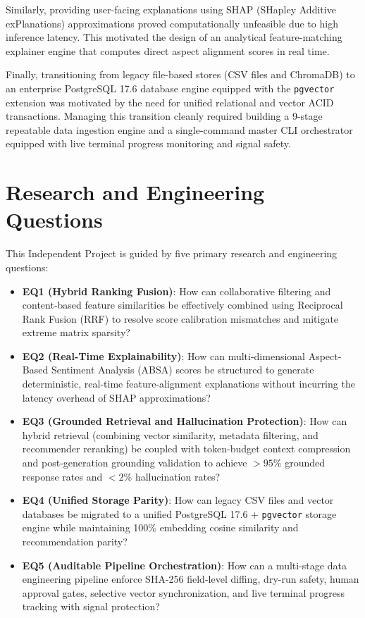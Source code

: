 Similarly, providing user-facing explanations using SHAP (SHapley Additive exPlanations) approximations proved computationally unfeasible due to high inference latency. This motivated the design of an analytical feature-matching explainer engine that computes direct aspect alignment scores in real time.

Finally, transitioning from legacy file-based stores (CSV files and ChromaDB) to an enterprise PostgreSQL 17.6 database engine equipped with the \texttt{pgvector} extension was motivated by the need for unified relational and vector ACID transactions. Managing this transition cleanly required building a 9-stage repeatable data ingestion engine and a single-command master CLI orchestrator equipped with live terminal progress monitoring and signal safety.

\section{Research and Engineering Questions}
This Independent Project is guided by five primary research and engineering questions:
\begin{itemize}
    \item \textbf{EQ1 (Hybrid Ranking Fusion)}: How can collaborative filtering and content-based feature similarities be effectively combined using Reciprocal Rank Fusion (RRF) to resolve score calibration mismatches and mitigate extreme matrix sparsity?
    \item \textbf{EQ2 (Real-Time Explainability)}: How can multi-dimensional Aspect-Based Sentiment Analysis (ABSA) scores be structured to generate deterministic, real-time feature-alignment explanations without incurring the latency overhead of SHAP approximations?
    \item \textbf{EQ3 (Grounded Retrieval and Hallucination Protection)}: How can hybrid retrieval (combining vector similarity, metadata filtering, and recommender reranking) be coupled with token-budget context compression and post-generation grounding validation to achieve $>95\%$ grounded response rates and $<2\%$ hallucination rates?
    \item \textbf{EQ4 (Unified Storage Parity)}: How can legacy CSV files and vector databases be migrated to a unified PostgreSQL 17.6 + \texttt{pgvector} storage engine while maintaining 100\% embedding cosine similarity and recommendation parity?
    \item \textbf{EQ5 (Auditable Pipeline Orchestration)}: How can a multi-stage data engineering pipeline enforce SHA-256 field-level diffing, dry-run safety, human approval gates, selective vector synchronization, and live terminal progress tracking with signal protection?
\end{itemize}

